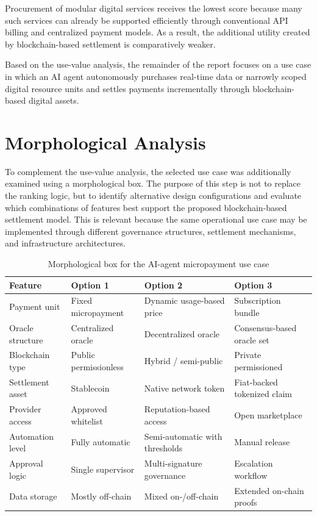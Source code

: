 \documentclass[12pt,a4paper,oneside]{article}
\theoremstyle{definition}
\theoremstyle{plain}
\begin{document}
Procurement of modular digital services receives the lowest score because many such services can already be supported efficiently through conventional API billing and centralized payment models. As a result, the additional utility created by blockchain-based settlement is comparatively weaker.

Based on the use-value analysis, the remainder of the report focuses on a use case in which an AI agent autonomously purchases real-time data or narrowly scoped digital resource units and settles payments incrementally through blockchain-based digital assets.

\section{Morphological Analysis}

To complement the use-value analysis, the selected use case was additionally examined using a morphological box. The purpose of this step is not to replace the ranking logic, but to identify alternative design configurations and evaluate which combinations of features best support the proposed blockchain-based settlement model. This is relevant because the same operational use case may be implemented through different governance structures, settlement mechanisms, and infrastructure architectures.


\begin{table}[H]
\centering
\caption{Morphological box for the AI-agent micropayment use case}
\label{tab:morphological}
\begin{tabular}{p{3.4cm}p{3.0cm}p{3.0cm}p{3.0cm}}
\toprule
\textbf{Feature} & \textbf{Option 1} & \textbf{Option 2} & \textbf{Option 3} \\
\midrule
Payment unit & Fixed micropayment & Dynamic usage-based price & Subscription bundle \\
Oracle structure & Centralized oracle & Decentralized oracle & Consensus-based oracle set \\
Blockchain type & Public permissionless & Hybrid / semi-public & Private permissioned \\
Settlement asset & Stablecoin & Native network token & Fiat-backed tokenized claim \\
Provider access & Approved whitelist & Reputation-based access & Open marketplace \\
Automation level & Fully automatic & Semi-automatic with thresholds & Manual release \\
Approval logic & Single supervisor & Multi-signature governance & Escalation workflow \\
Data storage & Mostly off-chain & Mixed on-/off-chain & Extended on-chain proofs \\
\bottomrule
\end{tabular}
\end{table}
\end{document}
